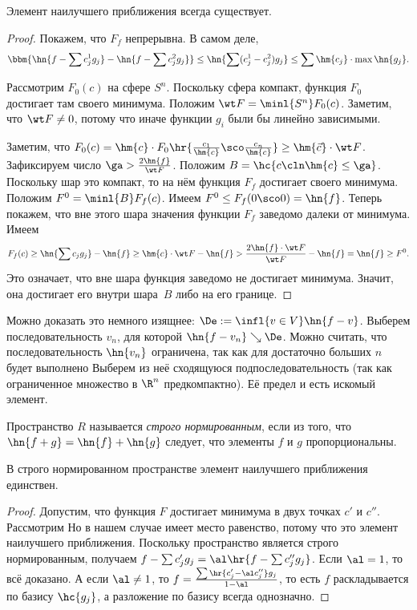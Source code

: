 \documentclass[a4paper]{article}
\begin{document}
\begin{theorem}
Элемент наилучшего приближения всегда существует.
\end{theorem}
\begin{proof}
Покажем, что $F_f$ непрерывна. В самом деле,
$$\bbm{ \hn{f - \sum c_j^1 g_j} - \hn{f - \sum c_j^2 g_j}} \le
\hn{\sum (c_j^1 - c_j^2) g_j} \le \sum \hm{c_j} \cdot \max \hn{g_j}.$$

Рассмотрим $F_0(c)$ на сфере $S^n$. Поскольку сфера компакт, функция
$F_0$ достигает там своего минимума. Положим $\wt F = \minl{S^n}
F_0(c)$. Заметим, что $\wt F \neq 0$, потому что иначе функции $g_i$
были бы линейно зависимыми.

Заметим, что $F_0(c) = \hm{c} \cdot F_0\hr{\frac{c_1}{\hm{c}}\sco
  \frac{c_n}{\hm{c}}} \ge \hm{\vec c} \cdot \wt F$.  Зафиксируем число
$\ga > \frac{2 \hn{f}}{\wt F}$. Положим $B = \hc{c\cln \hm{c} \le
  \ga}$.  Поскольку шар это компакт, то на нём функция $F_f$ достигает
своего минимума.  Положим $F^0 = \minl{B} F_f(c)$.  Имеем $F^0 \le
F_f(0\sco 0) = \hn{f}$.  Теперь покажем, что вне этого шара значения
функции $F_f$ заведомо далеки от минимума.  Имеем $$F_f(c) \ge
\hn{\sum c_j g_j}- \hn{f} \ge \hm{c} \cdot \wt F - \hn{f} >
\frac{2\hn{f}\cdot \wt F}{\wt F} - \hn{f} = \hn{f} \ge F^0.$$ Это
означает, что вне шара функция заведомо не достигает минимума. Значит,
она достигает его внутри шара~$B$ либо на его границе.
\end{proof}

\begin{note}
Можно доказать это немного изящнее: $\De := \infl{v\in V}
\hn{f-v}$. Выберем последовательность $v_n$, для которой $\hn{f - v_n}
\searrow \De$. Можно считать, что последовательность $\hn{v_n}$
ограничена, так как для достаточно больших $n$ будет выполнено
  Выберем из
неё сходящуюся подпоследовательность (так как ограниченное множество в
$\R^n$ предкомпактно). Её предел и есть искомый элемент.
\end{note}

\begin{df}
Пространство $R$ называется \emph{строго нормированным}, если из того,
что $\hn{f+g} = \hn{f} + \hn{g}$ следует, что элементы $f$ и $g$
пропорциональны.
\end{df}

\begin{theorem}
В строго нормированном пространстве элемент наилучшего приближения
единствен.
\end{theorem}
\begin{proof}
Допустим, что функция $F$ достигает минимума в двух точках $c'$ и
$c''$.  Рассмотрим   Но в нашем случае имеет место
равенство, потому что это элемент наилучшего приближения.  Поскольку
пространство является строго нормированным, получаем $f - \sum c'_j
g_j = \al\hr{f - \sum c''_j g_j}$.  Если $\al = 1$, то всё доказано. А
если $\al \neq 1$, то $f = \frac{\sum \hr{c'_j - \al
    c''_j}g_j}{1-\al}$, то есть $f$ раскладывается по базису
$\hc{g_j}$, а разложение по базису всегда однозначно.
\end{proof}
\end{document}

